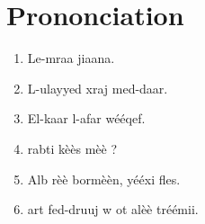 \chapter{Prononciation}

\begin{enumerate}
    \item Le-mraa ji\ca aana.
    \item L-ulayyed xraj med-daar.
    \item El-kaar l-a\cs far wééqef.
    \item \VS rabt\vs i kèès mèè ?
    \item Alb\va{} \vs rèè bor\ct mèèn, yééxi fles.
    \item \CA\th art fed-druuj w \ct o\hb t \ca alèè tréémii.
\end{enumerate}